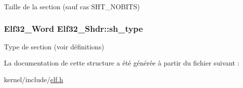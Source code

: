 Taille de la section (sauf cas S\+H\+T\+\_\+\+N\+O\+B\+I\+T\+S) \hypertarget{structElf32__Shdr_aab6c221dbd7e16987df41280fb915408}{
\subsubsection[{sh\+\_\+type}]{\setlength{\rightskip}{0pt plus 5cm}Elf32\+\_\+\+Word Elf32\+\_\+\+Shdr\+::sh\+\_\+type}}\label{structElf32__Shdr_aab6c221dbd7e16987df41280fb915408}
Type de section (voir définitions) 

La documentation de cette structure a été générée à partir du fichier suivant \+:\begin{DoxyCompactItemize}
\item 
kernel/include/\hyperlink{elf_8h}{elf.\+h}\end{DoxyCompactItemize}
